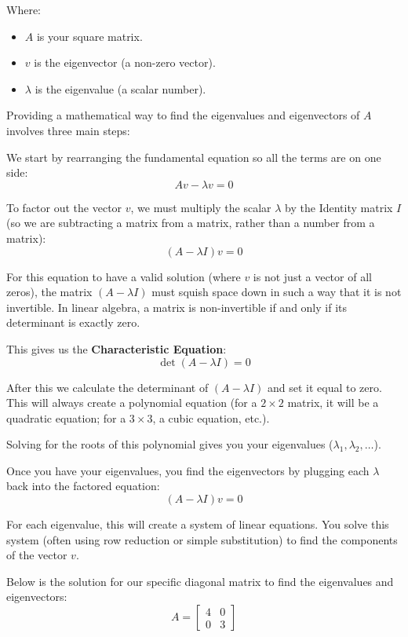 \documentclass[twoside, 10pt]{article}
\begin{document}
Where:
\begin{itemize}
    \item $A$ is your square matrix.
    \item $v$ is the eigenvector (a non-zero vector).
    \item $\lambda$ is the eigenvalue (a scalar number).
\end{itemize}

Providing a mathematical way to find the eigenvalues and eigenvectors of $A$ involves three main steps:

We start by rearranging the fundamental equation so all the terms are on one side:
\[ Av - \lambda v = 0 \]

To factor out the vector $v$, we must multiply the scalar $\lambda$ by the Identity matrix $I$ (so we are subtracting a matrix from a matrix, rather than a number from a matrix):
\[ (A - \lambda I)v = 0 \]

For this equation to have a valid solution (where $v$ is not just a vector of all zeros), the matrix $(A - \lambda I)$ must squish space down in such a way that it is not invertible. In linear algebra, a matrix is non-invertible if and only if its determinant is exactly zero.

This gives us the \textbf{Characteristic Equation}:
\[ \det(A - \lambda I) = 0 \]

After this we calculate the determinant of $(A - \lambda I)$ and set it equal to zero. This will always create a polynomial equation (for a $2 \times 2$ matrix, it will be a quadratic equation; for a $3 \times 3$, a cubic equation, etc.).

Solving for the roots of this polynomial gives you your eigenvalues ($\lambda_1, \lambda_2, \dots$).

Once you have your eigenvalues, you find the eigenvectors by plugging each $\lambda$ back into the factored equation:
\[ (A - \lambda I)v = 0 \]

For each eigenvalue, this will create a system of linear equations. You solve this system (often using row reduction or simple substitution) to find the components of the vector $v$.

Below is the solution for our specific diagonal matrix to find the eigenvalues and eigenvectors:
\[ A = \begin{bmatrix} 4 & 0 \\ 0 & 3 \end{bmatrix} \]
\end{document}
